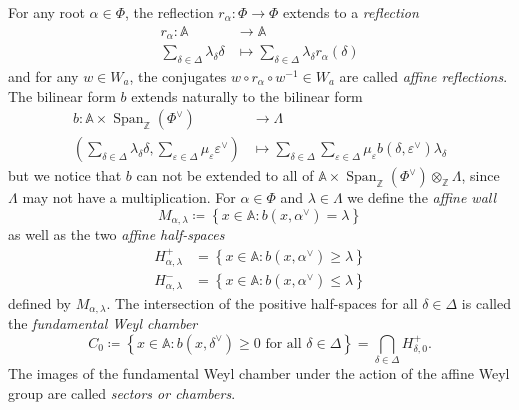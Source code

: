 \documentclass[12pt]{amsart}
\newcommand{\Z}{\mathbb{Z} }
\newcommand{\A}{\mathbb{A}}
\numberwithin{equation}{section}
\theoremstyle{remark} %
\begin{document}
	 For any root $\alpha \in \Phi$, the reflection $r_\alpha \colon \Phi \to \Phi$ extends to a \emph{reflection}
	 \begin{align*}
	 	r_{\alpha} \colon \A & \to \A \\
	 	\sum_{\delta \in \Delta} \lambda_\delta \delta & \mapsto \sum_{\delta \in \Delta} \lambda_\delta r_\alpha (\delta) %
	 \end{align*}
	 and for any $w \in W_a$, the conjugates $w \circ r_\alpha \circ w^{-1} \in W_a$ are called \emph{affine reflections}. %
	 The bilinear form $b$ %
	 extends naturally to the bilinear form
	 \begin{align*}
	 b \colon 	\A \times \operatorname{Span}_{\mathbb{Z}}(\Phi^\vee)  & \to \Lambda \\
	 	\left( \sum_{\delta \in \Delta} \lambda_\delta \delta , \sum_{\varepsilon \in \Delta } \mu_{\varepsilon} \varepsilon^\vee \right) & \mapsto \sum_{\delta \in \Delta} \sum_{ \varepsilon\in \Delta} \mu_{\varepsilon}   b( \delta, \varepsilon^\vee)  \lambda_{\delta}
	 \end{align*}
	 but we notice that $b$ can not be extended to all of $\A \times \operatorname{Span}_{\Z}(\Phi^\vee) \otimes_{\Z} \Lambda$, since $\Lambda$ may not have a multiplication. For $\alpha\in \Phi$ and $\lambda \in \Lambda$ we define the \emph{affine wall}
	 $$
	 M_{\alpha,\lambda} \coloneqq
	 \left\{x \in \A \colon  b(x, \alpha^\vee ) = \lambda  \right\}
	 $$
	 as well as the two \emph{affine half-spaces} 
	 \begin{align*}
	 	H_{\alpha, \lambda}^+ &= \left\{ x\in \A \colon    b( x, \alpha^\vee ) \geq \lambda  \right\} \\
	 	H_{\alpha, \lambda}^- &= \left\{ x \in \A \colon  b( x, \alpha^\vee ) \leq \lambda  \right\}
	 \end{align*}
	 defined by $M_{\alpha,\lambda}$. The intersection of the positive half-spaces for all $\delta \in \Delta$ is called the \emph{fundamental Weyl chamber}
	 $$
	 C_0 \coloneqq \left\{ x \in \A \colon b\left(x, \delta^\vee \right) \geq 0 \text{ for all } \delta \in \Delta \right\} = \bigcap_{\delta \in \Delta} H_{\delta,0}^+.
	 $$
	 The images of the fundamental Weyl chamber under the action of the affine Weyl group are called \emph{sectors or chambers}.
\end{document}
